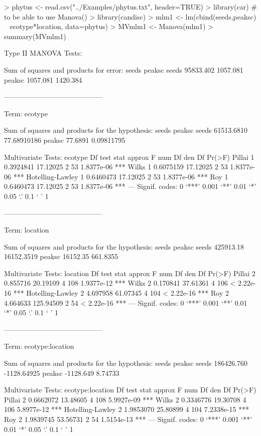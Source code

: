 \documentclass{article}
\begin{document}
\begin{Schunk}
\begin{Sinput}
> phytus <- read.csv("../Examples/phytus.txt", header=TRUE)
> library(car) # to be able to use Manova()
> library(candisc)
> mlm1 <- lm(cbind(seeds,peaksc) ~ ecotype*location, data=phytus)
> MVmlm1 <- Manova(mlm1)
> summary(MVmlm1)
\end{Sinput}
\begin{Soutput}
Type II MANOVA Tests:

Sum of squares and products for error:
           seeds   peaksc
seeds  95833.402 1057.081
peaksc  1057.081 1420.384

------------------------------------------
 
Term: ecotype 

Sum of squares and products for the hypothesis:
            seeds      peaksc
seeds  61513.6810 77.68910186
peaksc    77.6891  0.09811795

Multivariate Tests: ecotype
                 Df test stat approx F num Df den Df     Pr(>F)    
Pillai            1 0.3924841 17.12025      2     53 1.8377e-06 ***
Wilks             1 0.6075159 17.12025      2     53 1.8377e-06 ***
Hotelling-Lawley  1 0.6460473 17.12025      2     53 1.8377e-06 ***
Roy               1 0.6460473 17.12025      2     53 1.8377e-06 ***
---
Signif. codes:  0 ‘***’ 0.001 ‘**’ 0.01 ‘*’ 0.05 ‘.’ 0.1 ‘ ’ 1

------------------------------------------
 
Term: location 

Sum of squares and products for the hypothesis:
           seeds     peaksc
seeds  425913.18 16152.3519
peaksc  16152.35   661.8355

Multivariate Tests: location
                 Df test stat  approx F num Df den Df     Pr(>F)    
Pillai            2  0.855716  20.19109      4    108 1.9377e-12 ***
Wilks             2  0.170841  37.61361      4    106 < 2.22e-16 ***
Hotelling-Lawley  2  4.697958  61.07345      4    104 < 2.22e-16 ***
Roy               2  4.664633 125.94509      2     54 < 2.22e-16 ***
---
Signif. codes:  0 ‘***’ 0.001 ‘**’ 0.01 ‘*’ 0.05 ‘.’ 0.1 ‘ ’ 1

------------------------------------------
 
Term: ecotype:location 

Sum of squares and products for the hypothesis:
            seeds      peaksc
seeds  186426.760 -1128.64925
peaksc  -1128.649     8.74733

Multivariate Tests: ecotype:location
                 Df test stat approx F num Df den Df     Pr(>F)    
Pillai            2 0.6662072 13.48605      4    108 5.9927e-09 ***
Wilks             2 0.3346776 19.30708      4    106 5.8977e-12 ***
Hotelling-Lawley  2 1.9853070 25.80899      4    104 7.2338e-15 ***
Roy               2 1.9839745 53.56731      2     54 1.5154e-13 ***
---
Signif. codes:  0 ‘***’ 0.001 ‘**’ 0.01 ‘*’ 0.05 ‘.’ 0.1 ‘ ’ 1
\end{Soutput}
\end{Schunk}
\end{document}
